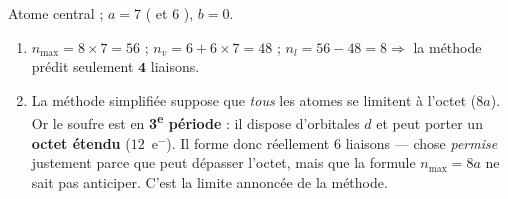 \documentclass[11pt,a4paper]{article}
\begin{document}
\begin{corrige}
Atome central  ; $a=7$ ( et $6$ ), $b=0$.
\begin{enumerate}[label=\alph*)]
  \item $n_{\max} = 8\times 7 = 56$ ; \; $n_v = 6 + 6\times 7 = 48$ ; \;
        $n_l = 56 - 48 = 8 \Rightarrow$ la méthode prédit seulement $\mathbf{4}$ liaisons.
  \item La méthode simplifiée suppose que \emph{tous} les atomes se limitent à l'octet ($8a$).
        Or le soufre est en \textbf{3\textsuperscript{e} période} : il dispose d'orbitales $d$ et
        peut porter un \textbf{octet étendu} ($12$~e$^-$). Il forme donc réellement $6$ liaisons
         — chose \emph{permise} justement parce que  peut dépasser l'octet, mais que
        la formule $n_{\max}=8a$ ne sait pas anticiper. C'est la limite annoncée de la méthode.
\end{enumerate}
\end{corrige}
\end{document}
